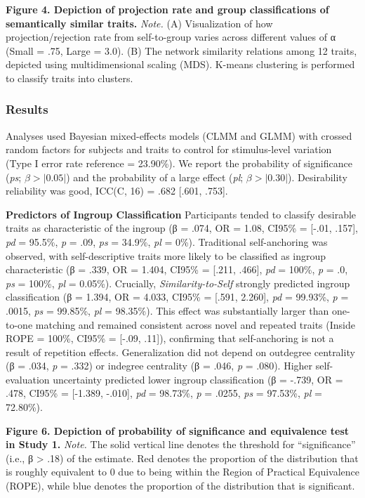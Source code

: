 \documentclass[
  man,
  longtable,
  nolmodern,
  notxfonts,
  notimes,
  man]{apa7}
\begin{document}
\textbf{Figure 4. Depiction of projection rate and group classifications
of semantically similar traits.} \emph{Note.} (A) Visualization of how
projection/rejection rate from self-to-group varies across different
values of α (Small = .75, Large = 3.0). (B) The network similarity
relations among 12 traits, depicted using multidimensional scaling
(MDS). K-means clustering is performed to classify traits into clusters.

\subsubsection{Results}\label{results}

Analyses used Bayesian mixed-effects models (CLMM and GLMM) with crossed
random factors for subjects and traits to control for stimulus-level
variation (Type I error rate reference = 23.90\%). We report the
probability of significance (\emph{ps}; \(\beta > |0.05|\)) and the
probability of a large effect (\emph{pl}; \(\beta > |0.30|\)).
Desirability reliability was good, ICC(C, 16) = .682 {[}.601, .753{]}.

\textbf{Predictors of Ingroup Classification} Participants tended to
classify desirable traits as characteristic of the ingroup (β = .074, OR
= 1.08, CI95\% = {[}-.01, .157{]}, \emph{pd} = 95.5\%, \emph{p} = .09,
\emph{ps} = 34.9\%, \emph{pl} = 0\%). Traditional self-anchoring was
observed, with self-descriptive traits more likely to be classified as
ingroup characteristic (β = .339, OR = 1.404, CI95\% = {[}.211, .466{]},
\emph{pd} = 100\%, \emph{p} = .0, \emph{ps} = 100\%, \emph{pl} =
0.05\%). Crucially, \emph{Similarity-to-Self} strongly predicted ingroup
classification (β = 1.394, OR = 4.033, CI95\% = {[}.591, 2.260{]},
\emph{pd} = 99.93\%, \emph{p} = .0015, \emph{ps} = 99.85\%, \emph{pl} =
98.35\%). This effect was substantially larger than one-to-one matching
and remained consistent across novel and repeated traits (Inside ROPE =
100\%, CI95\% = {[}-.09, .11{]}), confirming that self-anchoring is not
a result of repetition effects. Generalization did not depend on
outdegree centrality (β = .034, \emph{p} = .332) or indegree centrality
(β = .046, \emph{p} = .080). Higher self-evaluation uncertainty
predicted lower ingroup classification (β = -.739, OR = .478, CI95\% =
{[}-1.389, -.010{]}, \emph{pd} = 98.73\%, \emph{p} = .0255, \emph{ps} =
97.53\%, \emph{pl} = 72.80\%).

\textbf{Figure 6. Depiction of probability of significance and
equivalence test in Study 1.} \emph{Note.} The solid vertical line
denotes the threshold for ``significance'' (i.e., β \textgreater{}
\textbar.18\textbar) of the estimate. Red denotes the proportion of the
distribution that is roughly equivalent to 0 due to being within the
Region of Practical Equivalence (ROPE), while blue denotes the
proportion of the distribution that is significant.
\end{document}

